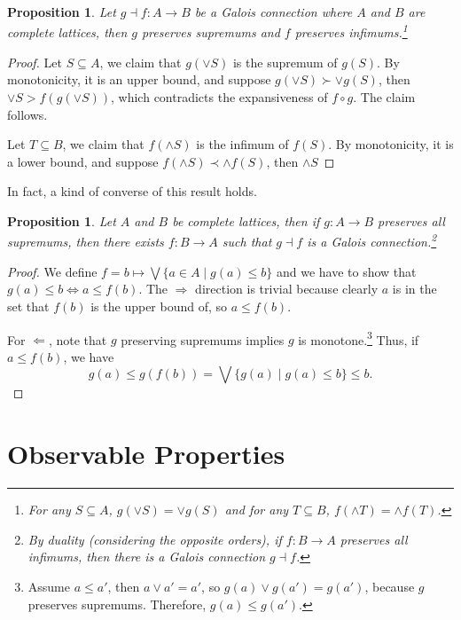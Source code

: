 \documentclass{tufte-handout} %
\newtheorem{prop}[thm]{Proposition}
\theoremstyle{definition}
\theoremstyle{remark}
\newcommand{\0}{\textsf{0}}
\newcommand{\1}{\textsf{1}}
\begin{document}
\begin{prop}
	Let $g \dashv f:A\rightarrow B$ be a Galois connection where $A$ and $B$ are complete lattices, then $g$ preserves supremums and $f$ preserves infimums.\footnote{For any $S \subseteq A$, $g(\vee S) = \vee g(S)$ and for any $T \subseteq B$, $f(\wedge T) = \wedge f(T)$.}
\end{prop}
\begin{proof}
	Let $S \subseteq A$, we claim that $g(\vee S)$ is the supremum of $g(S)$. By monotonicity, it is an upper bound, and suppose $g(\vee S)\succ \vee g(S) $, then $\vee S > f(g(\vee S))$, which contradicts the expansiveness of $f\circ g$. The claim follows.
	
	Let $T \subseteq B$, we claim that $f(\wedge S)$ is the infimum of $f(S)$. By monotonicity, it is a lower bound, and suppose $f(\wedge S) \prec \wedge f(S)$, then $\wedge S$ %
\end{proof}
In fact, a kind of converse of this result holds.
\begin{prop}
	Let $A$ and $B$ be complete lattices, then if $g:A\rightarrow B$ preserves all supremums, then there exists $f: B\rightarrow A$ such that $g\dashv f$ is a Galois connection.\footnote{By duality (considering the opposite orders), if $f: B\rightarrow A$ preserves all infimums, then there is a Galois connection $g\dashv f$.}
\end{prop}
\begin{proof}
	We define $f = b \mapsto \bigvee\{a \in A \mid g(a) \leq b\}$ and we have to show that $g(a) \leq b \Leftrightarrow a \leq f(b)$. The $\Rightarrow$ direction is trivial because clearly $a$ is in the set that $f(b)$ is the upper bound of, so $a\leq f(b)$.
	
	For $\Leftarrow$, note that $g$ preserving supremums implies $g$ is monotone.\footnote{Assume $a\leq a'$, then $a \vee a' = a'$, so $g(a) \vee g(a') = g(a')$, because $g$ preserves supremums. Therefore, $g(a) \leq g(a')$.}
	Thus, if $a \leq f(b)$, we have \[g(a) \leq g(f(b)) = \bigvee \{ g(a) \mid g(a) \leq b\} \leq b.\]
\end{proof}

\section{Observable Properties}
\end{document}
